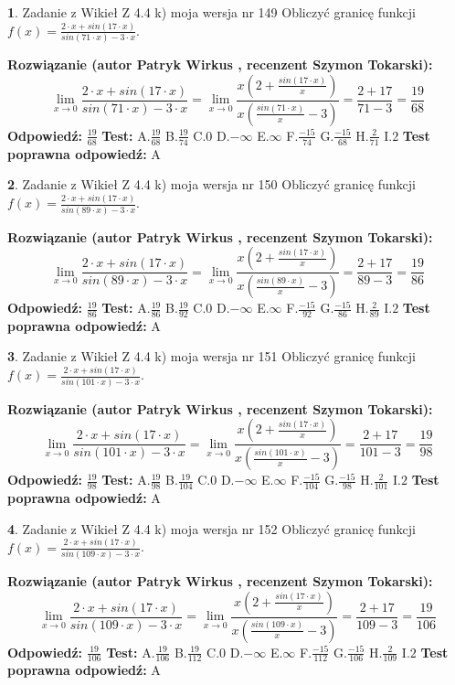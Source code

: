\documentclass[12pt, a4paper]{article}
\theoremstyle{definition} %
\newtheorem{zad}{}
\newcommand{\zadStart}[1]{\begin{zad}#1\newline}
\newcommand{\zadStop}{\end{zad}}
\newcommand{\rozwStart}[2]{\noindent \textbf{Rozwiązanie (autor #1 , recenzent #2): }\newline}
\newcommand{\rozwStop}{\newline}
\newcommand{\odpStart}{\noindent \textbf{Odpowiedź:}\newline}
\newcommand{\odpStop}{\newline}
\newcommand{\testStart}{\noindent \textbf{Test:}\newline}
\newcommand{\testStop}{\newline}
\newcommand{\kluczStart}{\noindent \textbf{Test poprawna odpowiedź:}\newline}
\newcommand{\kluczStop}{\newline}
\begin{document}
\zadStart{Zadanie z Wikieł Z 4.4 k) moja wersja nr 149}
Obliczyć granicę funkcji $f(x)=\frac{2\cdot x +sin(17\cdot x)}{sin(71\cdot x) -3\cdot x}$.
\zadStop
\rozwStart{Patryk Wirkus}{Szymon Tokarski}
$$\lim\limits_{x\to 0}\frac{2\cdot x +sin(17\cdot x)}{sin(71\cdot x) -3\cdot x}
=\lim\limits_{x\to 0}\frac{x(2+\frac{sin(17\cdot x)}{x})}{x(\frac{sin(71\cdot x)}{x}-3)}
=\frac{2+17}{71-3} = \frac{19}{68}$$
\rozwStop
\odpStart
$\frac{19}{68}$
\odpStop
\testStart
A.$\frac{19}{68}$
B.$\frac{19}{74}$
C.$0$
D.$-\infty$
E.$\infty$
F.$\frac{-15}{74}$
G.$\frac{-15}{68}$
H.$\frac{2}{71}$
I.$2$
\testStop
\kluczStart
A
\kluczStop



\zadStart{Zadanie z Wikieł Z 4.4 k) moja wersja nr 150}
Obliczyć granicę funkcji $f(x)=\frac{2\cdot x +sin(17\cdot x)}{sin(89\cdot x) -3\cdot x}$.
\zadStop
\rozwStart{Patryk Wirkus}{Szymon Tokarski}
$$\lim\limits_{x\to 0}\frac{2\cdot x +sin(17\cdot x)}{sin(89\cdot x) -3\cdot x}
=\lim\limits_{x\to 0}\frac{x(2+\frac{sin(17\cdot x)}{x})}{x(\frac{sin(89\cdot x)}{x}-3)}
=\frac{2+17}{89-3} = \frac{19}{86}$$
\rozwStop
\odpStart
$\frac{19}{86}$
\odpStop
\testStart
A.$\frac{19}{86}$
B.$\frac{19}{92}$
C.$0$
D.$-\infty$
E.$\infty$
F.$\frac{-15}{92}$
G.$\frac{-15}{86}$
H.$\frac{2}{89}$
I.$2$
\testStop
\kluczStart
A
\kluczStop



\zadStart{Zadanie z Wikieł Z 4.4 k) moja wersja nr 151}
Obliczyć granicę funkcji $f(x)=\frac{2\cdot x +sin(17\cdot x)}{sin(101\cdot x) -3\cdot x}$.
\zadStop
\rozwStart{Patryk Wirkus}{Szymon Tokarski}
$$\lim\limits_{x\to 0}\frac{2\cdot x +sin(17\cdot x)}{sin(101\cdot x) -3\cdot x}
=\lim\limits_{x\to 0}\frac{x(2+\frac{sin(17\cdot x)}{x})}{x(\frac{sin(101\cdot x)}{x}-3)}
=\frac{2+17}{101-3} = \frac{19}{98}$$
\rozwStop
\odpStart
$\frac{19}{98}$
\odpStop
\testStart
A.$\frac{19}{98}$
B.$\frac{19}{104}$
C.$0$
D.$-\infty$
E.$\infty$
F.$\frac{-15}{104}$
G.$\frac{-15}{98}$
H.$\frac{2}{101}$
I.$2$
\testStop
\kluczStart
A
\kluczStop



\zadStart{Zadanie z Wikieł Z 4.4 k) moja wersja nr 152}
Obliczyć granicę funkcji $f(x)=\frac{2\cdot x +sin(17\cdot x)}{sin(109\cdot x) -3\cdot x}$.
\zadStop
\rozwStart{Patryk Wirkus}{Szymon Tokarski}
$$\lim\limits_{x\to 0}\frac{2\cdot x +sin(17\cdot x)}{sin(109\cdot x) -3\cdot x}
=\lim\limits_{x\to 0}\frac{x(2+\frac{sin(17\cdot x)}{x})}{x(\frac{sin(109\cdot x)}{x}-3)}
=\frac{2+17}{109-3} = \frac{19}{106}$$
\rozwStop
\odpStart
$\frac{19}{106}$
\odpStop
\testStart
A.$\frac{19}{106}$
B.$\frac{19}{112}$
C.$0$
D.$-\infty$
E.$\infty$
F.$\frac{-15}{112}$
G.$\frac{-15}{106}$
H.$\frac{2}{109}$
I.$2$
\testStop
\kluczStart
A
\kluczStop
\end{document}
